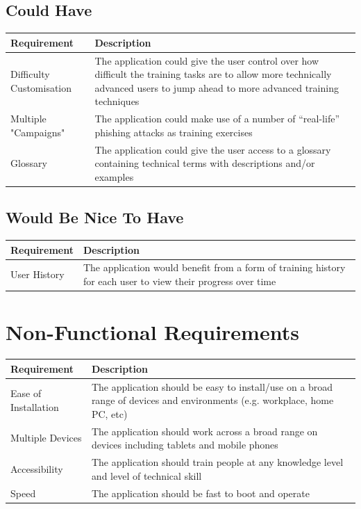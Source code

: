 \documentclass{l4proj}
\begin{document}
\subsection{Could Have}
\begin{tabular}{ | m{10em} | m{30em}| } 
  \hline
  \textbf{Requirement} & \textbf{Description} \\ 
  \hline
  Difficulty Customisation & The application could give the user control over how difficult the training tasks are to allow more technically advanced users to jump ahead to more advanced training techniques \\ 
  \hline
  Multiple "Campaigns" & The application could make use of a number of “real-life” phishing attacks as training exercises  \\ 
  \hline
  Glossary & The application could give the user access to a glossary containing technical terms with descriptions and/or examples \\ 
  \hline
\end{tabular}

\subsection{Would Be Nice To Have}
\begin{tabular}{ | m{10em} | m{30em}| } 
  \hline
  \textbf{Requirement} & \textbf{Description} \\ 
  \hline
  User History & The application would benefit from a form of training history for each user to view their progress over time \\ 
  \hline
\end{tabular}

\section{Non-Functional Requirements}
\begin{tabular}{ | m{10em} | m{30em}| } 
  \hline
  \textbf{Requirement} & \textbf{Description} \\ 
  \hline
  Ease of Installation & The application should be easy to install/use on a broad range of devices and environments (e.g. workplace, home PC, etc) \\ 
  \hline
  Multiple Devices & The application should work across a broad range on devices including tablets and mobile phones \\ 
  \hline
  Accessibility & The application should train people at any knowledge level and level of technical skill \\ 
  \hline
  Speed & The application should be fast to boot and operate \\ 
  \hline
\end{tabular} 
\end{document}
